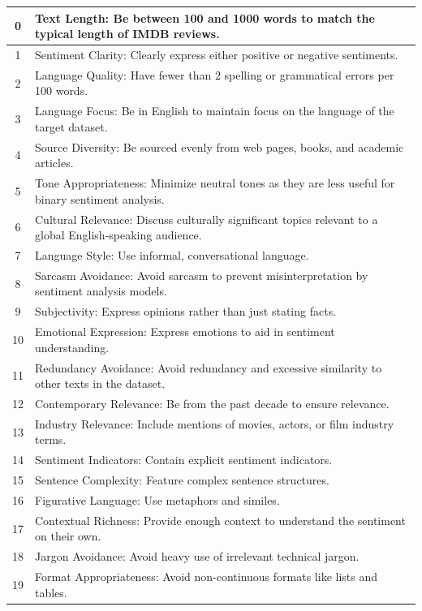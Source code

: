 \documentclass{article}
\begin{document}
\begin{longtable}{c|p{14cm}}
0  & Text Length: Be between 100 and 1000 words to match the typical length of IMDB reviews. \\
\hline
1  & Sentiment Clarity: Clearly express either positive or negative sentiments. \\
\hline
2  & Language Quality: Have fewer than 2 spelling or grammatical errors per 100 words. \\
\hline
3  & Language Focus: Be in English to maintain focus on the language of the target dataset. \\
\hline
4  & Source Diversity: Be sourced evenly from web pages, books, and academic articles. \\
\hline
5  & Tone Appropriateness: Minimize neutral tones as they are less useful for binary sentiment analysis. \\
\hline
6  & Cultural Relevance: Discuss culturally significant topics relevant to a global English-speaking audience. \\
\hline
7  & Language Style: Use informal, conversational language. \\
\hline
8  & Sarcasm Avoidance: Avoid sarcasm to prevent misinterpretation by sentiment analysis models. \\
\hline
9  & Subjectivity: Express opinions rather than just stating facts. \\
\hline
10 & Emotional Expression: Express emotions to aid in sentiment understanding. \\
\hline
11 & Redundancy Avoidance: Avoid redundancy and excessive similarity to other texts in the dataset. \\
\hline
12 & Contemporary Relevance: Be from the past decade to ensure relevance. \\
\hline
13 & Industry Relevance: Include mentions of movies, actors, or film industry terms. \\
\hline
14 & Sentiment Indicators: Contain explicit sentiment indicators. \\
\hline
15 & Sentence Complexity: Feature complex sentence structures. \\
\hline
16 & Figurative Language: Use metaphors and similes. \\
\hline
17 & Contextual Richness: Provide enough context to understand the sentiment on their own. \\
\hline
18 & Jargon Avoidance: Avoid heavy use of irrelevant technical jargon. \\
\hline
19 & Format Appropriateness: Avoid non-continuous formats like lists and tables. \\

\end{longtable}
\end{document}
